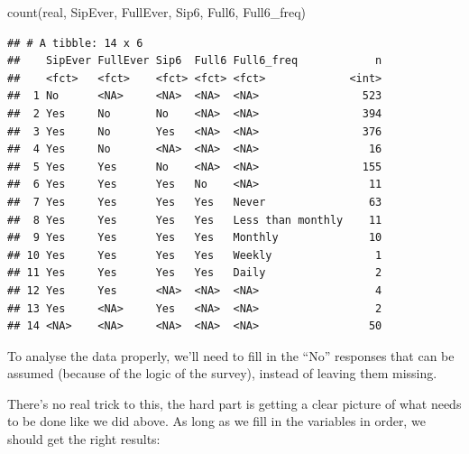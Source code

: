 \documentclass[
]{book}
\newenvironment{Shaded}{\begin{snugshade}}{\end{snugshade}}
\newcommand{\FunctionTok}[1]{\textcolor[rgb]{0.00,0.00,0.00}{#1}}
\newcommand{\NormalTok}[1]{#1}
\begin{document}
\begin{Shaded}
\begin{Highlighting}[]
\FunctionTok{count}\NormalTok{(real, SipEver, FullEver, Sip6, Full6, Full6\_freq)}
\end{Highlighting}
\end{Shaded}

\begin{verbatim}
## # A tibble: 14 x 6
##    SipEver FullEver Sip6  Full6 Full6_freq            n
##    <fct>   <fct>    <fct> <fct> <fct>             <int>
##  1 No      <NA>     <NA>  <NA>  <NA>                523
##  2 Yes     No       No    <NA>  <NA>                394
##  3 Yes     No       Yes   <NA>  <NA>                376
##  4 Yes     No       <NA>  <NA>  <NA>                 16
##  5 Yes     Yes      No    <NA>  <NA>                155
##  6 Yes     Yes      Yes   No    <NA>                 11
##  7 Yes     Yes      Yes   Yes   Never                63
##  8 Yes     Yes      Yes   Yes   Less than monthly    11
##  9 Yes     Yes      Yes   Yes   Monthly              10
## 10 Yes     Yes      Yes   Yes   Weekly                1
## 11 Yes     Yes      Yes   Yes   Daily                 2
## 12 Yes     Yes      <NA>  <NA>  <NA>                  4
## 13 Yes     <NA>     Yes   <NA>  <NA>                  2
## 14 <NA>    <NA>     <NA>  <NA>  <NA>                 50
\end{verbatim}

To analyse the data properly, we'll need to fill in the ``No'' responses that
can be assumed (because of the logic of the survey), instead of leaving
them missing.

There's no real trick to this, the hard part is getting a clear picture
of what needs to be done like we did above. As long as we fill in
the variables in order, we should get the right results:
\end{document}
